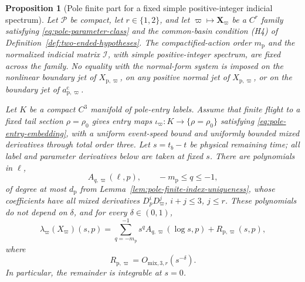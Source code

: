 \documentclass[11pt]{amsart}
\numberwithin{equation}{section}
\newtheorem{proposition}[theorem]{Proposition}
\theoremstyle{definition}
\theoremstyle{remark}
\begin{document}
\begin{proposition}[Pole finite part for a fixed simple positive-integer
indicial spectrum]
\label{prop:pole-varying-jet-finite-part}
Let $\mathcal P$ be compact, let $r\in\{1,2\}$, and let
$\varpi\mapsto\mathbf X_\varpi$ be a $C^r$ family satisfying
\eqref{eq:pole-parameter-class} and the common-basin condition
\textup{(H4)} of Definition~\ref{def:two-ended-hypotheses}.
The compactified-action order $m_{\mathrm p}$ and the normalized
indicial matrix $\mathcal I$, with simple positive-integer spectrum, are
fixed across the family.  No equality
with the normal-form system is imposed on the nonlinear
boundary jet of $X_{\mathrm p,\varpi}$, on any positive normal jet of
$X_{\mathrm p,\varpi}$, or on the boundary jet of
$a_{\mathrm p,\varpi}^{\mathrm c}$.

Let $K$ be a compact $C^3$ manifold of pole-entry labels.  Assume that
finite flight to a fixed tail section $\rho=\rho_0$ gives entry maps
$\iota_\varpi:K\to\{\rho=\rho_0\}$ satisfying
\eqref{eq:pole-entry-embedding}, with a uniform event-speed bound and
uniformly bounded mixed derivatives through total order three.  Let
$s=t_b-t$ be physical remaining time; all label and parameter derivatives
below are taken at fixed $s$.  There are polynomials in $\ell$,
\[
 A_{q,\varpi}(\ell,p),\qquad -m_{\mathrm p}\le q\le-1,
\]
of degree at most $d_{\mathrm p}$ from
Lemma~\ref{lem:pole-finite-index-uniqueness},
whose coefficients have all mixed derivatives
$D_p^iD_\varpi^j$, $i+j\le3$, $j\le r$.  These polynomials do not depend
on $\delta$, and for every $\delta\in(0,1)$,
\begin{equation}\label{eq:varying-pole-density-expansion}
 \lambda_\varpi(X_\varpi)(s,p)
 =\sum_{q=-m_{\mathrm p}}^{-1}s^qA_{q,\varpi}(\log s,p)
   +R_{\mathrm p,\varpi}(s,p),
\end{equation}
where
\begin{equation}\label{eq:varying-pole-density-remainder}
 R_{\mathrm p,\varpi}
 =O_{\mathrm{mix},3,r}(s^{-\delta}).
\end{equation}
In particular, the remainder is integrable at $s=0$.


\end{proposition}
\end{document}
